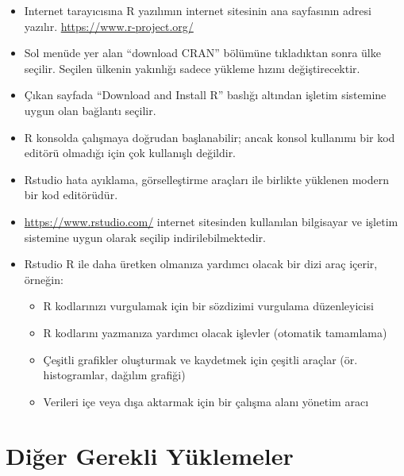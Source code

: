\documentclass[
  oneside]{book}
\begin{document}
\begin{itemize}
\item
  Internet tarayıcısına R yazılımın internet sitesinin ana sayfasının adresi yazılır. \url{https://www.r-project.org/}
\item
  Sol menüde yer alan ``download CRAN'' bölümüne tıkladıktan sonra ülke seçilir. Seçilen ülkenin yakınlığı sadece yükleme hızını değiştirecektir.
\item
  Çıkan sayfada ``Download and Install R'' baslığı altından işletim sistemine uygun olan bağlantı seçilir.
\item
  R konsolda çalışmaya doğrudan başlanabilir; ancak konsol kullanımı bir kod editörü olmadığı için çok kullanışlı değildir.
\item
  Rstudio hata ayıklama, görselleştirme araçları ile birlikte yüklenen modern bir kod editörüdür.
\item
  \url{https://www.rstudio.com/} internet sitesinden kullanılan bilgisayar ve işletim sistemine uygun olarak seçilip indirilebilmektedir.
\item
  Rstudio R ile daha üretken olmanıza yardımcı olacak bir dizi araç içerir, örneğin:

  \begin{itemize}
  \item
    R kodlarınızı vurgulamak için bir sözdizimi vurgulama düzenleyicisi
  \item
    R kodlarını yazmanıza yardımcı olacak işlevler (otomatik tamamlama)
  \item
    Çeşitli grafikler oluşturmak ve kaydetmek için çeşitli araçlar (ör. histogramlar, dağılım grafiği)
  \item
    Verileri içe veya dışa aktarmak için bir çalışma alanı yönetim aracı
  \end{itemize}
\end{itemize}

\hypertarget{diux11fer-gerekli-yuxfcklemeler}{%
\section{Diğer Gerekli Yüklemeler}\label{diux11fer-gerekli-yuxfcklemeler}}
\end{document}
